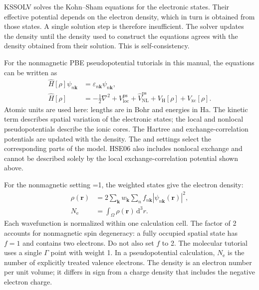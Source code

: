 KSSOLV solves the Kohn--Sham equations for the electronic states. Their effective potential depends on the electron density, which in turn is obtained from those states. A single solution step is therefore insufficient. The solver updates the density until the density used to construct the equations agrees with the density obtained from their solution. This is self-consistency.

For the nonmagnetic PBE pseudopotential tutorials in this manual, the equations can be written as
\begin{equation}
  \begin{aligned}
  \widehat H[\rho]\psi_{n\mathbf k}
    &=\varepsilon_{n\mathbf k}\psi_{n\mathbf k},\\
  \widehat H[\rho]&= -\frac12\nabla^2
  +V_{\mathrm{loc}}^{\mathrm{ps}}+\widehat V_{\mathrm{NL}}^{\mathrm{ps}}
  +V_{\mathrm H}[\rho]+V_{\mathrm{xc}}[\rho].
  \end{aligned}
  \label{eq:ks-operator}
\end{equation}
Atomic units are used here: lengths are in Bohr and energies in Ha. The kinetic term describes spatial variation of the electronic states; the local and nonlocal pseudopotentials describe the ionic cores. The Hartree and exchange-correlation potentials are updated with the density. The  and  settings select the corresponding parts of the model. HSE06 also includes nonlocal exchange and cannot be described solely by the local exchange-correlation potential shown above.

For the nonmagnetic setting =1, the weighted states give the electron density:
\begin{equation}
  \begin{aligned}
  \rho(\mathbf r)&=2\sum_{\mathbf k}w_{\mathbf k}
       \sum_n f_{n\mathbf k}|\psi_{n\mathbf k}(\mathbf r)|^2,\\
  N_{\mathrm e}&=\int_{\Omega}\rho(\mathbf r)\,\mathrm d^3r.
  \end{aligned}
  \label{eq:ks-density}
\end{equation}
Each wavefunction is normalized within one calculation cell. The factor of 2 accounts for nonmagnetic spin degeneracy: a fully occupied spatial state has $f=1$ and contains two electrons. Do not also set $f$ to 2. The molecular tutorial uses a single $\Gamma$ point with weight 1. In a pseudopotential calculation, $N_{\mathrm e}$ is the number of explicitly treated valence electrons. The density is an electron number per unit volume; it differs in sign from a charge density that includes the negative electron charge.

